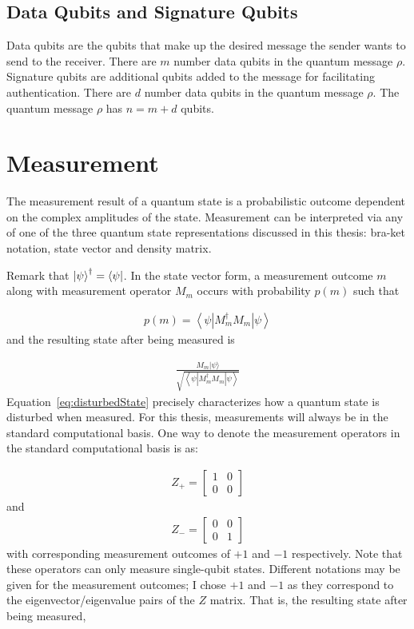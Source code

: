 \subsection{Data Qubits and Signature Qubits}
Data qubits are the qubits that make up the desired message the sender wants to send to the receiver. There are $m$ number data qubits in the quantum message $\rho$. Signature qubits are additional qubits added to the message for facilitating authentication. There are $d$ number data qubits in the quantum message $\rho$. The quantum message $\rho$ has $n = m + d$ qubits.
\section{Measurement}
\label{subsec:Measurements}
The measurement result of a quantum state is a probabilistic outcome dependent on the complex amplitudes of the state. Measurement can be interpreted via any of one of the three quantum state representations discussed in this thesis: bra-ket notation, state vector and density matrix.

Remark that $\ket{\psi}^{\dagger} = \bra{\psi}$. In the state vector form, a measurement outcome $m$ along with measurement operator $M_m$ occurs with probability $p(m)$ such that

\begin{align}
p(m)=\left\langle\psi\left|M_{m}^{\dagger} M_{m}\right| \psi\right\rangle
\end{align}
and the resulting state after being measured is

\begin{align}
\frac{M_{m}|\psi\rangle}{\sqrt{\left\langle\psi\left|M_{m}^{\dagger} M_{m}\right| \psi\right\rangle}} \label{eq:disturbedState}
\end{align}
Equation~\eqref{eq:disturbedState} precisely characterizes how a quantum state is disturbed when measured. For this thesis, measurements will always be in the standard computational basis. One way to denote the measurement operators in the standard computational basis is as:

\begin{align}
Z_+ = \left[\begin{array}{ll}
1 & 0 \\
0 & 0
\end{array}\right]
\end{align}
and
\begin{align}
Z_- = \left[\begin{array}{ll}
0 & 0 \\
0 & 1
\end{array}\right]
\end{align}
with corresponding measurement outcomes of $+1$ and $-1$ respectively. Note that these operators can only measure single-qubit states. Different notations may be given for the measurement outcomes; I chose $+1$ and $-1$ as they correspond to the eigenvector/eigenvalue pairs of the $Z$ matrix. That is, the resulting state after being measured,

